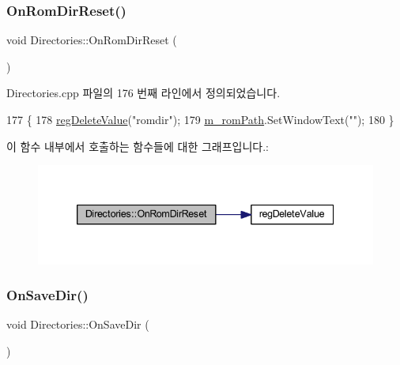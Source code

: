 \subsubsection{\texorpdfstring{On\+Rom\+Dir\+Reset()}{OnRomDirReset()}}
{\footnotesize\ttfamily void Directories\+::\+On\+Rom\+Dir\+Reset (\begin{DoxyParamCaption}{ }\end{DoxyParamCaption})\hspace{0.3cm}{\ttfamily [protected]}}



Directories.\+cpp 파일의 176 번째 라인에서 정의되었습니다.


\begin{DoxyCode}
177 \{
178   \mbox{\hyperlink{_reg_8cpp_aa7b7490d17e18a60838a58482114fd75}{regDeleteValue}}(\textcolor{stringliteral}{"romdir"});
179   \mbox{\hyperlink{class_directories_a2d5fa2646d8216ec7f2093073174ab38}{m\_romPath}}.SetWindowText(\textcolor{stringliteral}{""});
180 \}
\end{DoxyCode}
이 함수 내부에서 호출하는 함수들에 대한 그래프입니다.\+:
\nopagebreak
\begin{figure}[H]
\begin{center}
\leavevmode
\includegraphics[width=339pt]{class_directories_a944a8a843ab8f0cdec54bf8aaba7d8a5_cgraph}
\end{center}
\end{figure}
\mbox{\label{class_directories_a0951489dd35ed7af5fb7ea27c95fbe8e}} 
\subsubsection{\texorpdfstring{On\+Save\+Dir()}{OnSaveDir()}}
{\footnotesize\ttfamily void Directories\+::\+On\+Save\+Dir (\begin{DoxyParamCaption}{ }\end{DoxyParamCaption})\hspace{0.3cm}{\ttfamily [protected]}}



